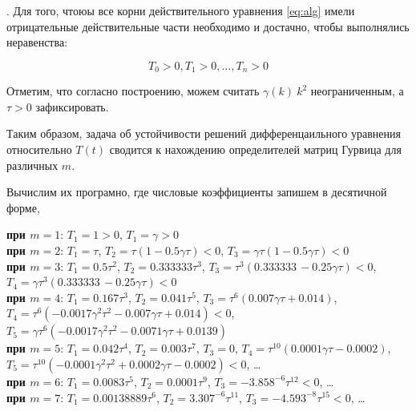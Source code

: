 . Для того, чтоюы все корни действительного уравнения \ref{eq:alg} имели отрицательные действительные части необходимо и достачно, чтобы выполнялись неравенства:

\begin{equation*}
T_0 > 0, T_1 >0, \dots, T_n > 0
\end{equation*}

Отметим, что согласно построению, можем считать $\gamma(k) ~ k^2$ неограниченным, а $\tau > 0$ зафиксировать.

Таким образом, задача об устойчивости решений дифференцаильного уравнения относительно $T(t)$ сводится к нахождению определителей матриц Гурвица для различных $m$.

Вычислим их програмно, где числовые коэффициенты запишем в десятичной форме,

\textbf{при $m=1$}: $T_1 = 1 > 0$, $T_1 = \gamma > 0$\\

\textbf{при $m=2$}: $T_1 = \tau$, $T_2 = \tau (1 - 0.5 \gamma \tau) < 0$, $T_3 = \gamma \tau (1 - 0.5 \gamma \tau) < 0$\\

\textbf{при $m=3$}: $T_1 = 0.5 \tau ^2$, $T_2 = 0.333333 \tau ^3$, $T_3 = \tau ^3 (0.333333\, -0.25 \gamma  \tau ) < 0$, $T_4 = \gamma  \tau ^3 (0.333333\, -0.25 \gamma  \tau ) < 0$\\

\textbf{при $m=4$}: $T_1 = 0.167 \tau ^3$, $T_2 = 0.041 \tau ^5$, $T_3 = \tau ^6 (0.007 \gamma  \tau + 0.014)$, \\$T_4 = \tau ^6 \left(-0.0017 \gamma ^2 \tau ^2-0.007 \gamma  \tau +0.014\right) < 0$, $T_5 = \gamma  \tau ^6 \left(-0.0017 \gamma ^2 \tau ^2-0.0071 \gamma  \tau +0.0139 \right)$\\

\textbf{при $m=5$}: $T_1 = 0.042 \tau ^4$, $T_2 = 0.003 \tau ^7$, $T_3 = 0$, $T_4 = \tau ^{10} (0.0001 \gamma  \tau -0.0002)$, $T_5 = \tau ^{10} \left(-0.0001 \gamma ^2 \tau ^2+0.0002 \gamma  \tau -0.0002\right) < 0$, \dots\\

\textbf{при $m=6$}: $T_1 = 0.0083 \tau ^5$, $T_2 = 0.0001 \tau ^9$, $T_3 = -3.858^{-6} \tau ^{12} < 0$, \dots\\

\textbf{при $m=7$}: $T_1 = 0.00138889 \tau ^6$, $T_2 = 3.307^{-6} \tau ^{11}$, $T_3 = -4.593^{-8} \tau ^{15} < 0$, \dots\\

